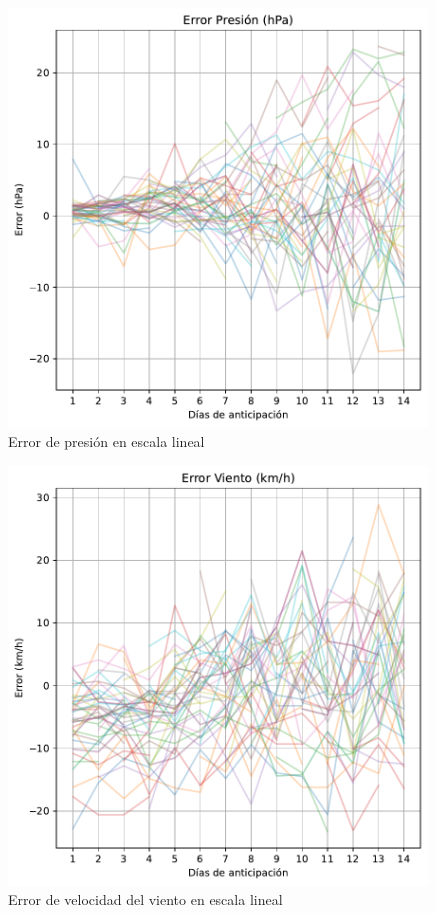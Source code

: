 \documentclass[
  10pt,
  a4paper,
  DIV=11,
  numbers=noendperiod,
  open=any]{scrreprt}
\numberwithin{equation}{chapter}
\numberwithin{equation}{section}
\renewcommand{\[}{\begin{equation}}
\renewcommand{\]}{\end{equation}}
\begin{document}
\begin{figure}[h]
  \centering
  \includegraphics[width=0.99\textwidth]{03-meteorologia/predicciones_files/figure-pdf/cell-2-output-3.pdf}
  \caption{Error de presión en escala lineal}
\end{figure}

\begin{figure}[h]
  \centering
  \includegraphics[width=0.99\textwidth]{03-meteorologia/predicciones_files/figure-pdf/cell-2-output-4.pdf}
  \caption{Error de velocidad del viento en escala lineal}
\end{figure}
\end{document}
